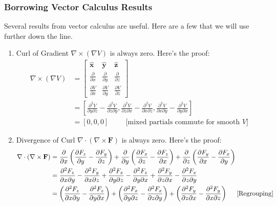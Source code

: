 \subsubsection{Borrowing Vector Calculus Results}
Several results from vector calculus are useful. Here are
a few that we will use further down the line.
\begin{enumerate}
  \item Curl of Gradient \(\nabla \times (\nabla V)\) is always zero. Here's the proof:
    \begin{align*}
      \nabla \times (\nabla V) &= \begin{bmatrix}
        \hat{\mathbf{x}} & \hat{\mathbf{y}} & \hat{\mathbf{z}}\\
        \frac{\partial}{\partial x} &
        \frac{\partial}{\partial y} &
        \frac{\partial}{\partial z}\\
        \frac{\partial V}{\partial x} & \frac{\partial V}{\partial y} & \frac{\partial V}{\partial z}
      \end{bmatrix}\\
      &= \left[\frac{\partial^2 V}{\partial y \partial z} - \frac{\partial^2 V}{\partial z \partial y}, \frac{\partial^2 V}{\partial z \partial x} - \frac{\partial^2 V}{\partial x \partial z}, \frac{\partial^2 V}{\partial x \partial y} - \frac{\partial^2 V}{\partial y \partial x}\right] \\
      &= [0, 0, 0] \hspace{1cm} \text{[mixed partials commute for smooth } V\text{]}
    \end{align*}
  \item Divergence of Curl \(\nabla \cdot (\nabla \times \mathbf{F})\) is always zero. Here's
  the proof:
      \begin{align*}
        \nabla \cdot (\nabla \times \mathbf{F}) &= \frac{\partial}{\partial x} \left(\frac{\partial F_z}{\partial y} - \frac{\partial F_y}{\partial z}\right) + \frac{\partial}{\partial y} \left(\frac{\partial F_x}{\partial z} - \frac{\partial F_z}{\partial x}\right) + \frac{\partial}{\partial z} \left(\frac{\partial F_y}{\partial x} - \frac{\partial F_x}{\partial y}\right)\\
        &= \frac{\partial^2 F_z}{\partial x \partial y} - \frac{\partial^2 F_y}{\partial x \partial z} + \frac{\partial^2 F_x}{\partial y \partial z} - \frac{\partial^2 F_z}{\partial y \partial x} + \frac{\partial^2 F_y}{\partial z \partial x} - \frac{\partial^2 F_x}{\partial z \partial y}\\
        &= \left(\frac{\partial^2 F_z}{\partial x \partial y} - \frac{\partial^2 F_z}{\partial y \partial x}\right) + \left(\frac{\partial^2 F_x}{\partial y \partial z} - \frac{\partial^2 F_x}{\partial z \partial y}\right) + \left(\frac{\partial^2 F_y}{\partial z \partial x} - \frac{\partial^2 F_y}{\partial x \partial z}\right) \hspace{0.5cm} \text{[Regrouping]}\\

\end{align*}
\end{enumerate}
